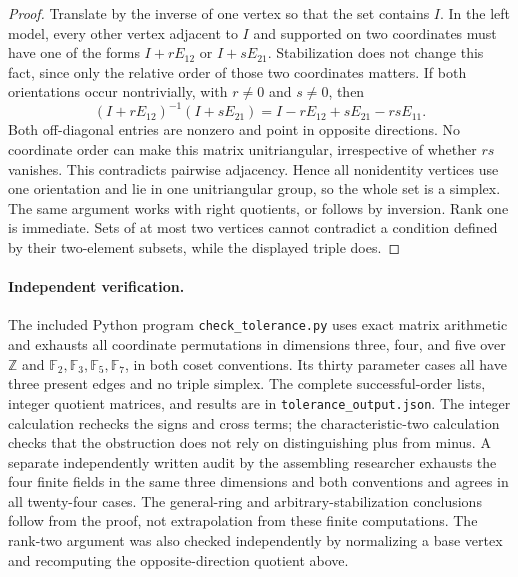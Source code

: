 \begin{proof}
Translate by the inverse of one vertex so that the set contains \(I\).
In the left model, every other vertex adjacent to \(I\) and supported
on two coordinates must have one of the forms
\(I+rE_{12}\) or \(I+sE_{21}\). Stabilization does not change this
fact, since only the relative order of those two coordinates matters.
If both orientations occur nontrivially, with \(r\ne0\) and \(s\ne0\),
then
\[
 (I+rE_{12})^{-1}(I+sE_{21})
       =I-rE_{12}+sE_{21}-rsE_{11}.
\]
Both off-diagonal entries are nonzero and point in opposite directions.
No coordinate order can make this matrix unitriangular, irrespective of
whether \(rs\) vanishes. This contradicts pairwise adjacency.
Hence all nonidentity vertices use one orientation and lie in one
unitriangular group, so the whole set is a simplex. The same argument
works with right quotients, or follows by inversion. Rank one is
immediate. Sets of at most two vertices cannot contradict a condition
defined by their two-element subsets, while the displayed triple does.
\end{proof}

\paragraph{Independent verification.}\oursComputed\par
The included Python program \texttt{check\_tolerance.py} uses exact
matrix arithmetic and exhausts all coordinate permutations in dimensions
three, four, and five over \(\mathbb Z\) and
\(\mathbb F_2,\mathbb F_3,\mathbb F_5,\mathbb F_7\), in both coset
conventions. Its thirty parameter cases all have three present edges
and no triple simplex. The complete successful-order lists, integer
quotient matrices, and results are in \texttt{tolerance\_output.json}.
The integer calculation rechecks the signs and cross terms; the
characteristic-two calculation checks that the obstruction does not
rely on distinguishing plus from minus. A separate independently
written audit by the assembling researcher exhausts the four finite
fields in the same three dimensions and both conventions and agrees in
all twenty-four cases. The general-ring and arbitrary-stabilization
conclusions follow from the proof, not extrapolation from these finite
computations. The rank-two argument was also checked independently by
normalizing a base vertex and recomputing the opposite-direction
quotient above.


